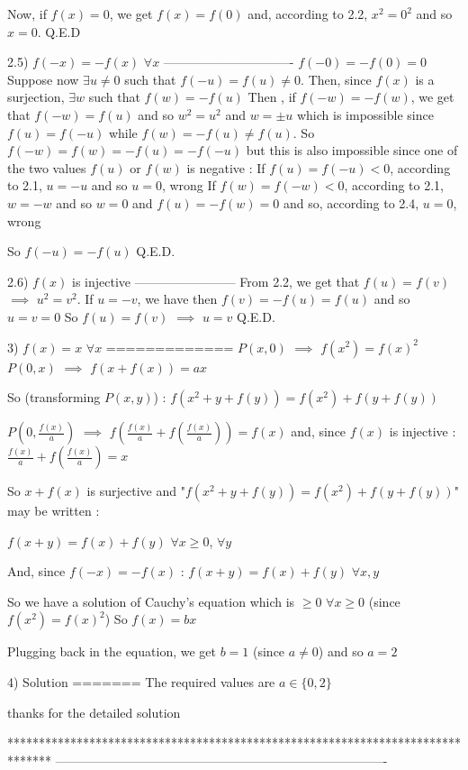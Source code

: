 \begin{solution}
Now, if $ f(x) = 0$, we get $ f(x) = f(0)$ and, according to 2.2, $ x^2 = 0^2$ and so $ x = 0$.
Q.E.D

2.5) $ f( - x) = - f(x)$ $ \forall x$
-------------------------------
$ f( - 0) = - f(0) = 0$
Suppose now $ \exists u\ne 0$ such that $ f( - u) = f(u)\ne 0$. Then, since $ f(x)$ is a surjection, $ \exists w$ such that $ f(w) = - f(u)$
Then , if $ f( - w) = - f(w)$, we get that $ f( - w) = f(u)$ and so $ w^2 = u^2$ and $ w = \pm u$ which is impossible since $ f(u) = f( - u)$ while $ f(w) = - f(u)\ne f(u)$. 
So $ f( - w) = f(w) = - f(u) = - f( - u)$ but this is also impossible since one of the two values $ f(u)$ or $ f(w)$ is negative :
If $ f(u) = f( - u) < 0$, according to 2.1, $ u = - u$ and so $ u = 0$, wrong
If $ f(w) = f( - w) < 0$, according to 2.1, $ w = - w$ and so $ w = 0$ and $ f(u) = - f(w) = 0$ and so, according to 2.4, $ u = 0$, wrong

So $ f( - u) = - f(u)$
Q.E.D.

2.6) $ f(x)$ is injective
------------------------
From 2.2, we get that $ f(u) = f(v)$ $ \implies$ $ u^2 = v^2$. 
If $ u = - v$, we have then $ f(v) = - f(u) = f(u)$ and so $ u = v = 0$ 
So $ f(u) = f(v)$ $ \implies$ $ u = v$
Q.E.D.

3) $ f(x) = x$ $ \forall x$
=============
$ P(x,0)$ $ \implies$ $ f(x^2) = f(x)^2$
$ P(0,x)$ $ \implies$ $ f(x + f(x)) = ax$

So (transforming $ P(x,y)$) : $ f(x^2 + y + f(y)) = f(x^2) + f(y + f(y))$

$ P(0,\frac {f(x)}a)$ $ \implies$ $ f(\frac {f(x)}a + f(\frac {f(x)}a)) = f(x)$ and, since $ f(x)$ is injective : $ \frac {f(x)}a + f(\frac {f(x)}a) = x$

So $ x + f(x)$ is surjective and "$ f(x^2 + y + f(y)) = f(x^2) + f(y + f(y))$" may be written :

$ f(x + y) = f(x) + f(y)$ $ \forall x\ge 0$, $ \forall y$

And, since $ f( - x) = - f(x)$ : $ f(x + y) = f(x) + f(y)$ $ \forall x,y$

So we have a solution of Cauchy's equation which is $ \ge 0$ $ \forall x\ge 0$ (since $ f(x^2) = f(x)^2$)
So $ f(x) = bx$

Plugging back in the equation, we get $ b = 1$ (since $ a\ne 0$) and so $ a = 2$

4) Solution
=======
The required values are $ a\in\{0,2\}$
\end{solution}



\begin{solution}
	thanks for the detailed solution
\end{solution}
*******************************************************************************
-------------------------------------------------------------------------------

